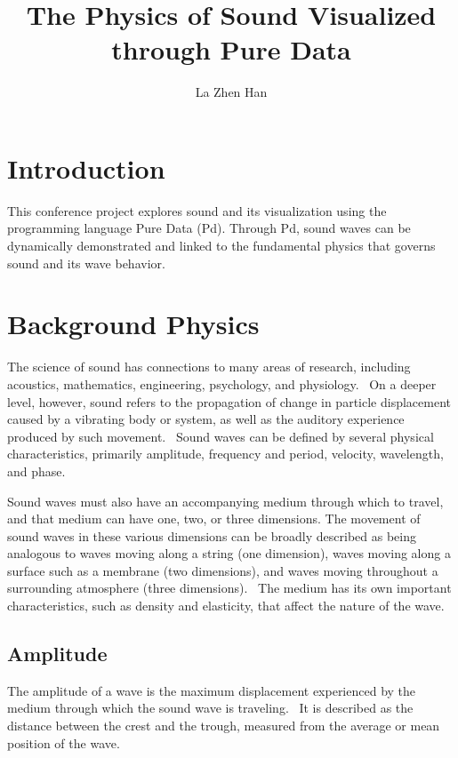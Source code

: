 \documentclass[12pt]{article}
\begin{document}
\title{The Physics of Sound Visualized through Pure Data}
\author{La Zhen Han}
\maketitle

\section{Introduction}

This conference project explores sound and its visualization using the programming language Pure Data (Pd). Through Pd, sound waves can be dynamically demonstrated and linked to the fundamental physics that governs sound and its wave behavior.

\section{Background Physics}

The science of sound has connections to many areas of research, including acoustics, mathematics, engineering, psychology, and physiology.~\cite{olson} On a deeper level, however, sound refers to the propagation of change in particle displacement caused by a vibrating body or system, as well as the auditory experience produced by such movement.~\cite{olson,backus} Sound waves can be defined by several physical characteristics, primarily amplitude, frequency and period, velocity, wavelength, and phase.

Sound waves must also have an accompanying medium through which to travel, and that medium can have one, two, or three dimensions. The movement of sound waves in these various dimensions can be broadly described as being analogous to waves moving along a string (one dimension), waves moving along a surface such as a membrane (two dimensions), and waves moving throughout a surrounding atmosphere (three dimensions).~\cite{backus} The medium has its own important characteristics, such as density and elasticity, that affect the nature of the wave.~\cite{backus}

\subsection{Amplitude}

The amplitude of a wave is the maximum displacement experienced by the medium through which the sound wave is traveling.~\cite{wood} It is described as the distance between the crest and the trough, measured from the average or mean position of the wave.~\cite{wood} 
\end{document}
